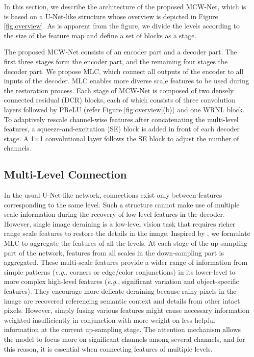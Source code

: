 \documentclass[a4paper,fleqn]{cas-dc}
\begin{document}
In this section, we describe the architecture of the proposed MCW-Net, which is is based on a U-Net-like structure whose overview is depicted in Figure \ref{fig:overview}. As is apparent from the figure, we divide the levels according to the size of the feature map and define a set of blocks as a stage.

 The proposed MCW-Net consists of an encoder part and a decoder part. The first three stages form the encoder part, and the remaining four stages the decoder part. We propose MLC, which connect all outputs of the encoder to all inputs of the decoder. MLC enables more diverse scale features to be used during the restoration process. Each stage of MCW-Net is composed of two densely connected residual (DCR) blocks, each of which consists of three convolution layers followed by PReLU \cite{trottier2017parametric} (refer Figure \ref{fig:overview}(b)) and one WRNL block. To adaptively rescale channel-wise features after concatenating the multi-level features, a squeeze-and-excitation (SE) block is added in front of each decoder stage. A 1$\times$1 convolutional layer follows the SE block to adjust the number of channels. 

\subsection{Multi-Level Connection}
\label{sec:multi-level connections}








In the usual U-Net-like network, connections exist only between features corresponding to the same level. Such a structure cannot make use of multiple scale information during the recovery of low-level features in the decoder. However, single image deraining is a low-level vision task that requires richer range scale features to restore the details in the image. Inspired by \cite{sun2019highresolutionposeestimation, tan2019efficientdet, wang2019highresolutionvisualrecognition}, we formulate MLC to aggregate the features of all the levels. At each stage of the up-sampling part of the network, features from all scales in the down-sampling part is aggregated. These multi-scale features provide a wider range of information from simple patterns (\textit{e.g.}, corners or edge/color conjunctions) in its lower-level to more complex high-level features (\textit{e.g.}, significant variation and object-specific features). They encourage more delicate deraining because rainy pixels in the image are recovered referencing semantic context and details from other intact pixels. However, simply fusing various features might cause 
necessary information weighted insufficiently in conjunction with more weight on less helpful information at the current up-sampling stage. The attention mechanism allows the model to focus more on significant channels among several channels, and for this reason, it is essential when connecting features of multiple levels.
\end{document}
